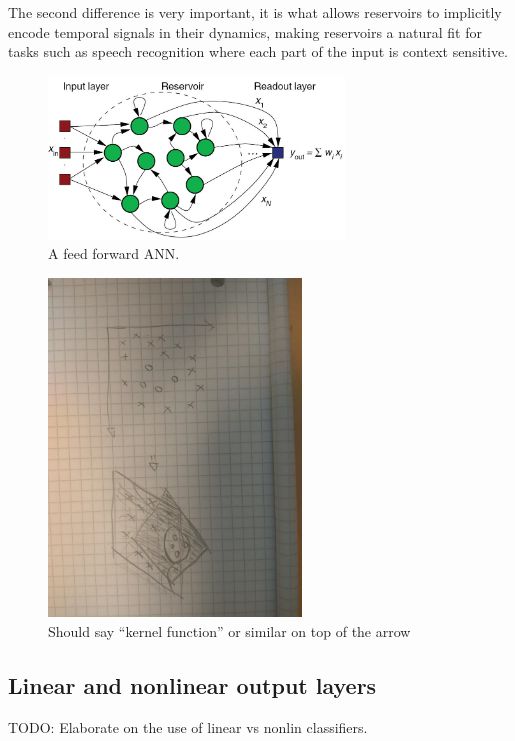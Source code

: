 The second difference is very important, it is what allows reservoirs to
implicitly encode temporal signals in their dynamics, making reservoirs a
natural fit for tasks such as speech recognition where each part of the input is
context sensitive.
\begin{figure}[h!]
  \centering
  \includegraphics[width=0.7\textwidth]{fig/RC.jpg}
  \caption{A feed forward ANN.}
  \label{figRC}
\end{figure}
\begin{figure}[h!]
  \centering
  \includegraphics[width=0.6\textwidth, angle =90]{fig/transform.jpg}
  \caption{Should say ``kernel function'' or similar on top of the arrow}
  \label{figSVM}
\end{figure}
\subsection{Linear and nonlinear output layers}
TODO: Elaborate on the use of linear vs nonlin classifiers.

\cleardoublepage

